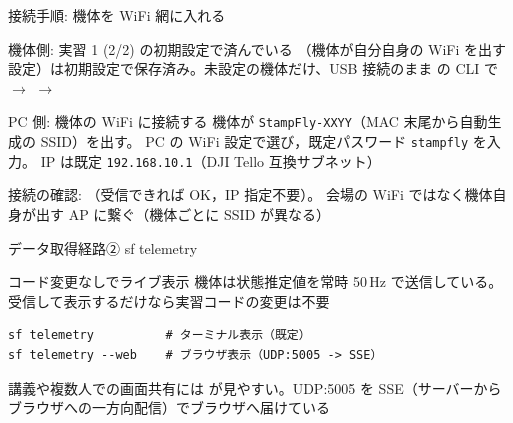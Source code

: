 \begin{frame}[fragile]{接続手順: 機体を WiFi 網に入れる}
  \begin{block}{機体側: 実習 1 (2/2) の初期設定で済んでいる}
    \footnotesize {}（機体が自分自身の WiFi を出す設定）は初期設定で保存済み。未設定の機体だけ、USB 接続のまま  の CLI で  $\to$  $\to$ 
  \end{block}

  \vspace{0.15em}

  \begin{exampleblock}{PC 側: 機体の WiFi に接続する}
    \footnotesize 機体が \texttt{StampFly-XXYY}（MAC 末尾から自動生成の SSID）を出す。
    PC の WiFi 設定で選び，既定パスワード \texttt{stampfly} を入力。
    IP は既定 \texttt{192.168.10.1}（DJI Tello 互換サブネット）
  \end{exampleblock}

  \vspace{0.15em}

  {\scriptsize 接続の確認: （受信できれば OK，IP 指定不要）。
  会場の WiFi ではなく機体自身が出す AP に繋ぐ（機体ごとに SSID が異なる）}
\end{frame}

\begin{frame}[fragile]{データ取得経路② sf telemetry\later}
  \begin{block}{コード変更なしでライブ表示}
    \small 機体は状態推定値を常時 50\,Hz で送信している。受信して表示するだけなら実習コードの変更は不要
  \end{block}

  \begin{lstlisting}[style=sfbash, numbers=none]
sf telemetry          # ターミナル表示（既定）
sf telemetry --web    # ブラウザ表示（UDP:5005 -> SSE）
  \end{lstlisting}

  \vspace{0.3em}

  {\small 講義や複数人での画面共有には  が見やすい。UDP:5005 を SSE（サーバーからブラウザへの一方向配信）でブラウザへ届けている}
\end{frame}

